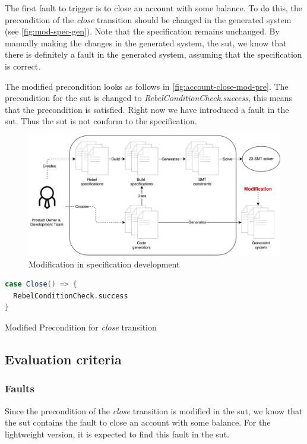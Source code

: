 The first fault to trigger is to close an account with some balance. To do this, the precondition of the \textit{close} transition should be changed in the generated system (see \autoref{fig:mod-spec-gen}). Note that the specification remains unchanged.
By manually making the changes in the generated system, the \gls{sut}, we know that there is definitely a fault in the generated system, assuming that the specification is correct.

The modified precondition looks as follows in
\autoref{fig:account-close-mod-pre}. The precondition for the \gls{sut} is
changed to \textit{RebelConditionCheck.success}, this means that the
precondition is satisfied. Right now we have introduced a fault in the
\gls{sut}. Thus the \gls{sut} is not conform to the specification.

\begin{figure}[h!]
  \centering
  \includegraphics[width=\linewidth{}]{figures/modified-sut.pdf}
  \caption{Modification in specification development}\label{fig:mod-spec-gen}
\end{figure}
\FloatBarrier

\begin{sourcecode}[h!]
\begin{lstlisting}[language=scala]
case Close() => {
  RebelConditionCheck.success
}
\end{lstlisting}
\caption{Modified Precondition for \textit{close} transition}\label{fig:account-close-mod-pre}
\end{sourcecode}
\FloatBarrier

\subsection{Evaluation criteria}\label{sec:ch4-eval-criteria}

\subsubsection{Faults}
Since the precondition of the \textit{close} transition is modified in the \gls{sut},
we know that the \gls{sut} contains the fault to close an account with some balance. For
the lightweight version, it is expected to find this fault in the \gls{sut}.

